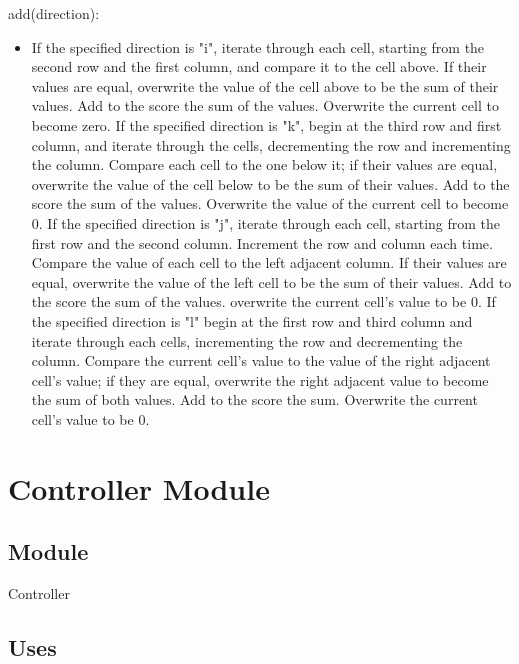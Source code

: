 \documentclass[12pt]{article}
\begin{document}
\noindent add(direction):
\begin{itemize}
\item If the specified direction is "i", iterate through each cell, starting from the second row and the first column, and compare it to the cell above. If their values are equal, overwrite the value of the cell above  to be the sum of their values. Add to the score the sum of the values. Overwrite the current cell to become zero. \newline
If the specified direction is "k", begin at the third row and first column, and iterate through the cells, decrementing the row and incrementing the column. Compare each cell to the one below it; if their values are equal, overwrite the value of the cell below to be the sum of their values. Add to the score the sum of the values. Overwrite the value of the current cell to become 0. \newline
If the specified direction is "j", iterate through each cell, starting from the first row and the second column. Increment the row and column each time. Compare the value of each cell to the left adjacent column.   If their values are equal, overwrite the value of the left cell to be the sum of their values. Add to the score the sum of the values. overwrite the current cell's value to be 0. \newline
If the specified direction is "l" begin at the first row and third column and iterate through each cells, incrementing the row and decrementing the column. Compare the current cell's value to the value of the right adjacent cell's value; if they are equal, overwrite the right adjacent value to become the sum of both values. Add to the score the sum. Overwrite the current cell's value to be 0. 
\end{itemize}

\newpage

\section* {Controller Module}

\subsection*{Module}

Controller

\subsection* {Uses}
\end{document}
